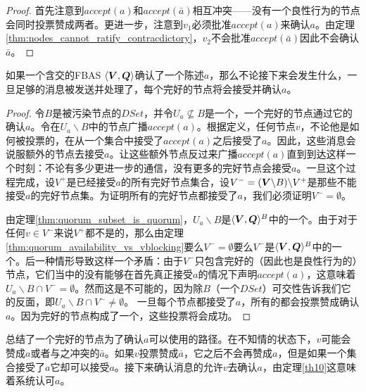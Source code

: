 \begin{proof}
	首先注意到$accept(a)$和$accept(\bar a)$相互冲突——没有一个良性行为的节点会同时投票赞成两者。更进一步，注意到$v_1$必须批准$accept(a)$来确认$a$。由定理\ref{thm:nodes_cannot_ratify_contracdictory}，$v_2$不会批准$accept(\bar a)$因此不会确认$\bar a$。
\end{proof}

\begin{theorem}\label{th10}
	如果一个含{\quorum}交的FBAS $\langle{\bm V},{\bm Q}\rangle$确认了一个陈述$a$，那么不论接下来会发生什么，一旦足够的消息被发送并处理了，每个完好的节点将会接受并确认$a$。
\end{theorem}

\begin{proof}
	令$B$是被污染节点的$DSet$，并令$U_a\not \subseteq B$是一个{\quorum}，一个完好的节点通过它的确认$a$。令在$U_a\backslash B$中的节点广播$accept(a)$。根据定义，任何节点$v$，不论他是如何被投票的，在从一个{\vblock}集合中接受了$accept(a)$之后接受了$a$。因此，这些消息会说服额外的节点去接受$a$。让这些额外节点反过来广播$accept(a)$直到到达这样一个时刻：不论有多少更进一步的通信，没有更多的完好节点会接受$a$。一旦这个过程完成，设$V^+$是已经接受$a$的所有完好节点集合，设$V^-=({\bm V}\backslash B)\backslash V^+$是那些不能接受$a$的完好节点集。为证明所有的完好节点都接受了$a$，我们必须证明$V^-=\emptyset$。

	由定理\ref{thm:quorum_subset_is_quorum}，$U_a\backslash B$是$\langle{\bm V},{\bm Q}\rangle^{B}$中的一个{\quorum}。由于对于任何$v\in V^-$来说$V^+$都不是{\vblock}的，那么由定理\ref{thm:quorum_availability_vs_vblocking}要么$V^-=\emptyset$要么$V^-$是$\langle{\bm V},{\bm Q}\rangle^{B}$中的一个{\quorum}。后一种情形导致这样一个矛盾：由于$V^-$只包含完好的（因此也是良性行为的）节点，它们当中的没有能够在首先真正接受$a$的情况下声明$accept(a)$，这意味着$U_a\backslash B\cap V^-=\emptyset$。然而这是不可能的，因为除$B$（一个$DSet$）{\quorum}可交性告诉我们它的反面，即$U_a\backslash B\cap V^-\neq\emptyset$。	一旦每个节点都接受了$a$，所有的都会投票赞成确认$a$。因为完好的节点构成了一个{\quorum}，这些投票将会成功。
\end{proof}

总结了一个完好的节点为了确认$a$可以使用的路径。在不知情的状态下，$v$可能会赞成$a$或者与之冲突的$\bar a$。如果$v$投票赞成$\bar a$，它之后不会再赞成$a$，但是如果一个{\vblock}集合接受了$a$它却可以接受$a$。接下来确认消息的{\quorum}允许$v$去确认$a$，由定理\ref{th10}这意味着系统认可$a$。